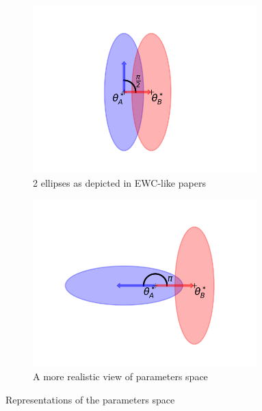 \documentclass[twocolumn]{article}
\begin{document}
\begin{figure}
    \begin{subfigure}[b]{0.25\textwidth}
        \centering
        \includegraphics[width=0.95\textwidth]{images/ellipse_overlap_90.png}
        \caption{2 ellipses as depicted in EWC-like papers}
        \label{fig:two_ellipses_90}
    \end{subfigure}
    \hspace{-8mm}
    \begin{subfigure}[b]{0.25\textwidth}
        \centering
        \includegraphics[width=0.95\textwidth]{images/ellipse_overlap_180.png}
        \caption{A more realistic view of parameters space}
        \label{fig:two_ellipses_180}
    \end{subfigure}
    \caption{Representations of the parameters space}
\end{figure}
\end{document}
